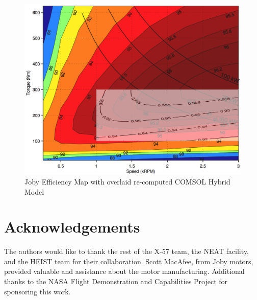 \documentclass[]{aiaa-tc}%
\begin{document}
\begin{figure}[!htb]%
	\centering
    \includegraphics[width=1.0\textwidth]{figures/map_compare.png}
	\caption{Joby Efficiency Map with overlaid re-computed COMSOL Hybrid Model}
	\label{fig:map}
\end{figure}

\section{Acknowledgements}

The authors would like to thank the rest of the X-57 team, the NEAT facility, and the HEIST team for their collaboration. Scott MacAfee, from Joby motors, provided valuable and assistance about the motor manufacturing. Additional thanks to the NASA Flight Demonstration and Capabilities Project for sponsoring this work.




\end{document}
